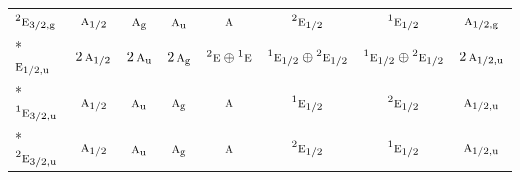 \documentclass[10pt,a4paper]{article}
\numberwithin{equation}{section}
\newcommand{\irr}[1]{\text{\normalfont\scshape #1}}
\newcommand{\conjpair}[1]{{}^{#1}}
\newcommand{\ptag}[1]{\mathrm{#1}}
\begin{document}
{\begin{longtable}{@{}lccccccc@{}}
$\conjpair{2}\irr{e}_{3/2,\ptag{g}}$ & $\irr{a}_{1/2}$ & $\irr{a}_{\ptag{g}}$ & $\irr{a}_{\ptag{u}}$ & $\irr{a}$ & $\conjpair{2}\irr{e}_{1/2}$ & $\conjpair{1}\irr{e}_{1/2}$ & $\irr{a}_{1/2,\ptag{g}}$\\*
$\irr{e}_{1/2,\ptag{u}}$ & $2\,\irr{a}_{1/2}$ & $2\,\irr{a}_{\ptag{u}}$ & $2\,\irr{a}_{\ptag{g}}$ & $\conjpair{2}\irr{e}\oplus \conjpair{1}\irr{e}$ & $\conjpair{1}\irr{e}_{1/2}\oplus \conjpair{2}\irr{e}_{1/2}$ & $\conjpair{1}\irr{e}_{1/2}\oplus \conjpair{2}\irr{e}_{1/2}$ & $2\,\irr{a}_{1/2,\ptag{u}}$\\*
$\conjpair{1}\irr{e}_{3/2,\ptag{u}}$ & $\irr{a}_{1/2}$ & $\irr{a}_{\ptag{u}}$ & $\irr{a}_{\ptag{g}}$ & $\irr{a}$ & $\conjpair{1}\irr{e}_{1/2}$ & $\conjpair{2}\irr{e}_{1/2}$ & $\irr{a}_{1/2,\ptag{u}}$\\*
$\conjpair{2}\irr{e}_{3/2,\ptag{u}}$ & $\irr{a}_{1/2}$ & $\irr{a}_{\ptag{u}}$ & $\irr{a}_{\ptag{g}}$ & $\irr{a}$ & $\conjpair{2}\irr{e}_{1/2}$ & $\conjpair{1}\irr{e}_{1/2}$ & $\irr{a}_{1/2,\ptag{u}}$\\
\bottomrule\end{longtable}}
\end{document}
